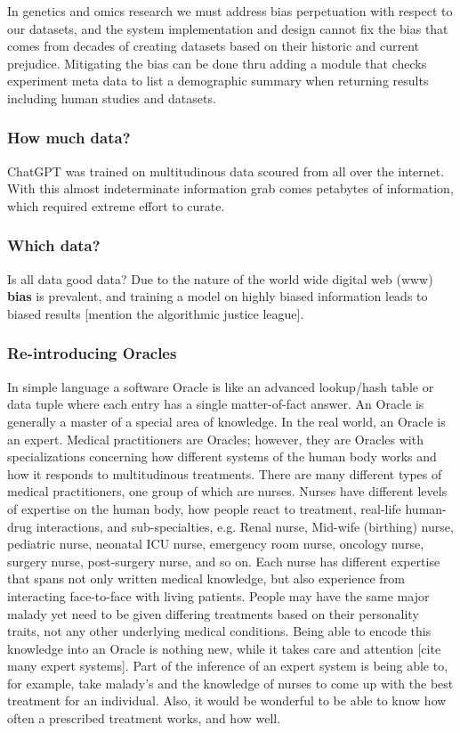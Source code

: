 In genetics and omics research we must address bias perpetuation with respect to our datasets, and the system implementation and design cannot fix the bias that comes from  decades of creating datasets based on their historic and current prejudice.
Mitigating the bias can be done thru adding a module that checks experiment meta data to list a demographic summary when returning results including human studies and datasets.

\subsubsection{How much data?}
ChatGPT was trained on multitudinous data scoured from all over the internet. 
With this almost indeterminate information grab comes petabytes of information, which required extreme effort to curate.
\subsubsection{Which data?}
Is all data good data?
Due to the nature of the world wide digital web (www) \textbf{bias} is prevalent, and training a model on highly biased information leads to biased results [mention the algorithmic justice league].
\subsubsection{Re-introducing Oracles}
In simple language a software Oracle is like an advanced lookup/hash table or data tuple where each entry has a single matter-of-fact answer.
An Oracle is generally a master of a special area of knowledge.
In the real world, an Oracle is an expert.
Medical practitioners are Oracles; however, they are Oracles with specializations concerning how different systems of the human body works and how it responds to multitudinous treatments.
There are many different types of medical practitioners, one group of which are nurses.
Nurses have different levels of expertise on the human body, how people react to treatment, real-life human-drug interactions, and sub-specialties, e.g. Renal nurse, Mid-wife (birthing) nurse, pediatric nurse, neonatal ICU nurse, emergency room nurse, oncology nurse, surgery nurse, post-surgery nurse, and so on.
Each nurse has different expertise that spans not only written medical knowledge, but also experience from interacting face-to-face with living patients.
People may have the same major malady yet need to be given differing treatments based on their personality traits, not any other underlying medical conditions.
Being able to encode this knowledge into an Oracle is nothing new, while it takes care and attention [cite many expert systems].
Part of the inference of an expert system is being able to, for example, take malady's and the knowledge of nurses to come up with the best treatment for an individual.
Also, it would be wonderful to be able to know how often a prescribed treatment works, and how well.

